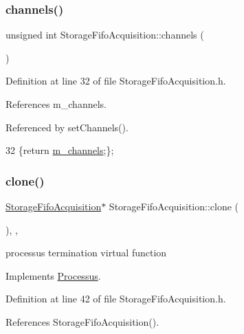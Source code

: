 \subsubsection{\texorpdfstring{channels()}{channels()}}
{\footnotesize\ttfamily unsigned int Storage\+Fifo\+Acquisition\+::channels (\begin{DoxyParamCaption}{ }\end{DoxyParamCaption})\hspace{0.3cm}{\ttfamily [inline]}}



Definition at line 32 of file Storage\+Fifo\+Acquisition.\+h.



References m\+\_\+channels.



Referenced by set\+Channels().


\begin{DoxyCode}
32 \{\textcolor{keywordflow}{return} \hyperlink{classStorageFifoAcquisition_ae3563f586533ac15f48c7f9c8fea3e7f}{m\_channels};\};
\end{DoxyCode}
\mbox{\label{classStorageFifoAcquisition_aab797010fd3efe7ef2c4a6e6ba4e87c2}} 
\subsubsection{\texorpdfstring{clone()}{clone()}}
{\footnotesize\ttfamily \hyperlink{classStorageFifoAcquisition_1_1StorageFifoAcquisition}{Storage\+Fifo\+Acquisition}$\ast$ Storage\+Fifo\+Acquisition\+::clone (\begin{DoxyParamCaption}{ }\end{DoxyParamCaption})\hspace{0.3cm}{\ttfamily [inline]}, {\ttfamily [protected]}, {\ttfamily [virtual]}}

processus termination virtual function 

Implements \hyperlink{classProcessus_aca8856f6d6d7b7e1fe941f298dcbb502}{Processus}.



Definition at line 42 of file Storage\+Fifo\+Acquisition.\+h.



References Storage\+Fifo\+Acquisition().


